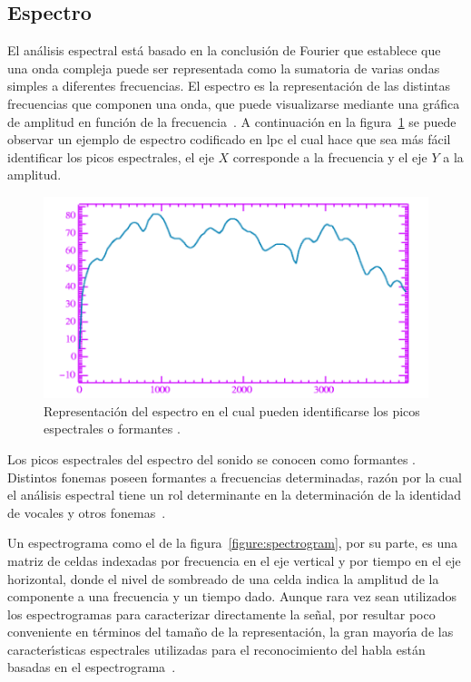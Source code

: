 \subsection{Espectro}
El an\'alisis espectral est\'a basado en la conclusi\'on de Fourier que establece que una onda compleja puede ser 
representada como la sumatoria de varias ondas simples a diferentes frecuencias. El espectro es la representaci\'on de las 
distintas frecuencias que componen una onda, que puede visualizarse mediante una gr\'afica de amplitud en funci\'on de la 
\mbox{frecuencia \cite{Jurafsky}}. A continuaci\'on en la figura~\ref{figure:formants} se puede observar un ejemplo
de espectro codificado en \gls{lpc} \cite{KesarkarFeature2003} el cual hace que sea m\'as f\'acil identificar los picos espectrales,
el eje $X$ corresponde a la frecuencia y el eje $Y$ a la amplitud.

\begin{figure}[H]
\centering
\includegraphics[width=0.6\linewidth]{./graphics/formants.png}
\caption{Representaci\'on del espectro en el cual pueden identificarse los picos espectrales o formantes 
\cite{Jurafsky}.}
\label{figure:formants}
\end{figure}

Los picos espectrales del espectro del sonido se conocen como formantes \cite{Fant1960acoustic}. Distintos fonemas poseen 
formantes a frecuencias determinadas, raz\'on por la cual el an\'alisis espectral tiene un rol determinante en la 
determinaci\'on de la identidad de vocales y otros \mbox{fonemas \cite{LadefogedCourse2006}}.

Un espectrograma como el de la figura~\ref{figure:spectrogram}, por su parte, es una matriz de celdas indexadas por
frecuencia en el eje vertical y por tiempo en el eje 
horizontal, donde el nivel de sombreado de una celda indica la amplitud de la componente a una frecuencia y un tiempo 
dado. Aunque rara vez sean utilizados los espectrogramas para caracterizar directamente la se\~nal,
por resultar poco conveniente en t\'erminos del tama\~no de la representaci\'on,
la gran mayor{\'\i}a de las caracter{\'\i}sticas espectrales utilizadas para el reconocimiento del 
habla est\'an basadas en el \mbox{espectrograma \cite{Ellis08anintroduction}}.

